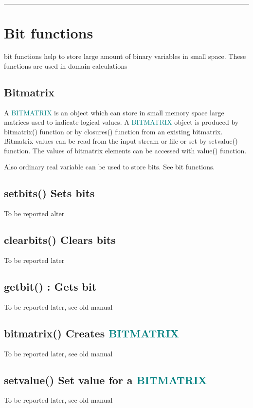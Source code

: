 \vspace{-7mm} \rule{5cm}{0.1pt} 
\onehalfspacing 
 
 
 
 
\section{Bit functions} 
\label{bit} 
bit functions help to store large amount of binary variables in small space. 
These functions are used in domain calculations 
\subsection{Bitmatrix} 
\label{bitmatrixo} 
A \textcolor{teal}{BITMATRIX} is an object which can store in small memory space large matrices 
used to indicate logical values. A \textcolor{teal}{BITMATRIX} object is produced by \textcolor{VioletRed}{bitmatrix}() 
function or by \textcolor{VioletRed}{closures}() function from an existing bitmatrix. Bitmatrix values 
can be read from the input stream or file or set by \textcolor{VioletRed}{setvalue}() function. The 
values of bitmatrix elements can be accessed with \textcolor{VioletRed}{value}() function. 
\begin{note} 
Also ordinary real variable can be used to store bits. See bit functions. 
\end{note} 
\subsection{\textcolor{VioletRed}{setbits}() Sets bits} 
\label{setbits} 
To be reported alter 
\subsection{\textcolor{VioletRed}{clearbits}() Clears bits} 
\label{clearbits} 
To be reported later 
\subsection{\textcolor{VioletRed}{getbit}() : Gets bit} 
\label{getbit} 
To be reported later, see old manual 
\subsection{\textcolor{VioletRed}{bitmatrix}() Creates \textcolor{teal}{BITMATRIX}} 
\label{bitmatrix} 
To be reported later,  see old manual 
\subsection{\textcolor{VioletRed}{setvalue}() Set value for a \textcolor{teal}{BITMATRIX}} 
\label{setvalue} 
To be reported later,  see old manual 
